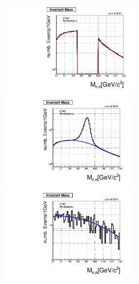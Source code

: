 \vspace{5mm}
\begin{minipage}{0.95\linewidth} 
\begin{center}
\mbox{
\includegraphics[height=0.550\textwidth, width=0.52\textwidth]{THESISPLOTS/Uncleaned-di-Photon-ZMass-Fit-DoubleElectron-Run2012A.pdf} \quad
\includegraphics[height=0.550\textwidth, width=0.52\textwidth]{THESISPLOTS/Background_In_ZMass-From-Di-Photon.pdf}
}
\mbox{
\includegraphics[height=0.550\textwidth, width=0.52\textwidth]{THESISPLOTS/Early-Time-Z-Events.pdf} \quad
}
\end{center}
\end{minipage}
